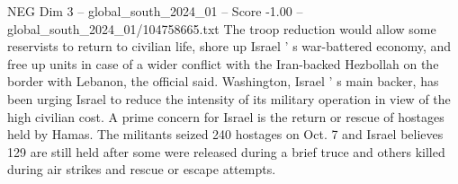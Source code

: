 \begin{textsample}{NEG Dim 3 – global\_south\_2024\_01 – Score -1.00 – global\_south\_2024\_01/104758665.txt}
The troop reduction would allow some reservists to return to civilian life, shore up Israel ' s war-battered economy, and free up units in case of a wider conflict with the Iran-backed Hezbollah on the border with Lebanon, the official said.
Washington, Israel ' s main backer, has been urging Israel to reduce the intensity of its military operation in view of the high civilian cost.
A prime concern for Israel is the return or rescue of hostages held by Hamas.
The militants seized 240 hostages on Oct. 7 and Israel believes 129 are still held after some were released during a brief truce and others killed during air strikes and rescue or escape attempts.

\end{textsample}
